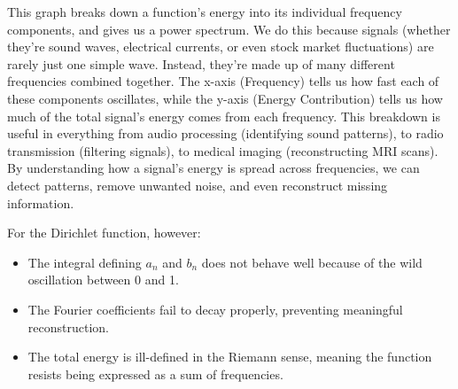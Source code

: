\documentclass{article}
\begin{document}
\begin{center}
\end{center}

This graph breaks down a function’s energy into its individual frequency components, and gives us a power spectrum. We do this because signals (whether they’re sound waves, electrical currents, or even stock market fluctuations) are rarely just one simple wave. Instead, they’re made up of many different frequencies combined together. The x-axis (Frequency) tells us how fast each of these components oscillates, while the y-axis (Energy Contribution) tells us how much of the total signal's energy comes from each frequency. This breakdown is useful in everything from audio processing (identifying sound patterns), to radio transmission (filtering signals), to medical imaging (reconstructing MRI scans). By understanding how a signal’s energy is spread across frequencies, we can detect patterns, remove unwanted noise, and even reconstruct missing information.

For the Dirichlet function, however:
\begin{itemize}
    \item The integral defining \( a_n \) and \( b_n \) does not behave well because of the wild oscillation between 0 and 1.
    \item The Fourier coefficients fail to decay properly, preventing meaningful reconstruction.
    \item The total energy is ill-defined in the Riemann sense, meaning the function resists being expressed as a sum of frequencies.
\end{itemize}
\end{document}
